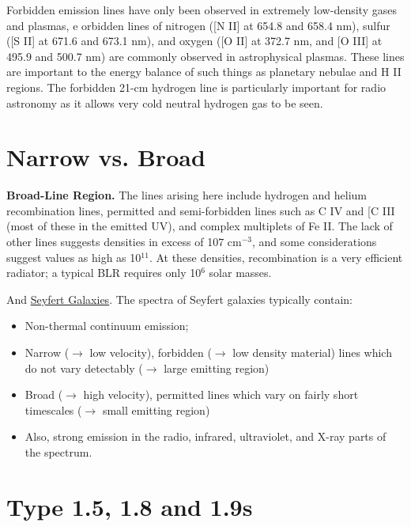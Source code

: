 \documentclass[11pt]{article}
\begin{document}
Forbidden emission lines have only been observed in extremely low-density gases and plasmas, e
orbidden lines of nitrogen ([N II] at 654.8 and 658.4 nm), sulfur ([S II] at 671.6 and 673.1 nm), and oxygen ([O II] at 372.7 nm, and [O III] at 495.9 and 500.7 nm) are commonly observed in astrophysical plasmas. These lines are important to the energy balance of such things as planetary nebulae and H II regions. The forbidden 21-cm hydrogen line is particularly important for radio astronomy as it allows very cold neutral hydrogen gas to be seen.



\section{Narrow vs. Broad}
{\bf Broad-Line Region.} The lines arising here include hydrogen and helium recombination lines, permitted and semi-forbidden lines such as C IV and [C III (most of these in the emitted UV), and complex multiplets of Fe II. The lack of other lines suggests densities in excess of 10$7$ cm$^{-3}$, and some considerations suggest values as high as 10$^{11}$. At these densities, recombination is a very efficient radiator; a typical BLR requires only 10$^6$ solar masses.

And \href{http://abyss.uoregon.edu/~js/ast123/lectures/lec12.html}{Seyfert Galaxies}. 
The spectra of Seyfert galaxies typically contain:
\begin{itemize} 
  \item{Non-thermal continuum emission;}
  \item{Narrow ($\rightarrow$ low velocity), forbidden ($\rightarrow$ low density material) lines which do not vary detectably ($\rightarrow$ large emitting region)}
      \item{Broad ($\rightarrow$ high velocity), permitted lines which vary on fairly short timescales 
          ($\rightarrow$ small emitting region)}
    \item{ Also, strong emission in the radio, infrared, ultraviolet, and X-ray parts of the spectrum.}
\end{itemize} 

\section{Type 1.5, 1.8 and 1.9s}
\end{document}
